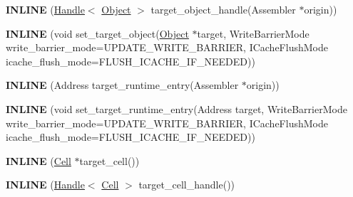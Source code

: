 \begin{DoxyCompactItemize}
\item 
\hypertarget{classv8_1_1internal_1_1_reloc_info_abd1a358990f0a48e294f2b420681ffeb}{}{\bfseries I\+N\+L\+I\+N\+E} (\hyperlink{classv8_1_1internal_1_1_handle}{Handle}$<$ \hyperlink{classv8_1_1internal_1_1_object}{Object} $>$ target\+\_\+object\+\_\+handle(Assembler $\ast$origin))\label{classv8_1_1internal_1_1_reloc_info_abd1a358990f0a48e294f2b420681ffeb}

\item 
\hypertarget{classv8_1_1internal_1_1_reloc_info_a20fe5e264759d58a3f9ed3da08bb59ca}{}{\bfseries I\+N\+L\+I\+N\+E} (void set\+\_\+target\+\_\+object(\hyperlink{classv8_1_1internal_1_1_object}{Object} $\ast$target, Write\+Barrier\+Mode write\+\_\+barrier\+\_\+mode=U\+P\+D\+A\+T\+E\+\_\+\+W\+R\+I\+T\+E\+\_\+\+B\+A\+R\+R\+I\+E\+R, I\+Cache\+Flush\+Mode icache\+\_\+flush\+\_\+mode=F\+L\+U\+S\+H\+\_\+\+I\+C\+A\+C\+H\+E\+\_\+\+I\+F\+\_\+\+N\+E\+E\+D\+E\+D))\label{classv8_1_1internal_1_1_reloc_info_a20fe5e264759d58a3f9ed3da08bb59ca}

\item 
\hypertarget{classv8_1_1internal_1_1_reloc_info_aa18787c0c4aa5185802b95fa932641dd}{}{\bfseries I\+N\+L\+I\+N\+E} (Address target\+\_\+runtime\+\_\+entry(Assembler $\ast$origin))\label{classv8_1_1internal_1_1_reloc_info_aa18787c0c4aa5185802b95fa932641dd}

\item 
\hypertarget{classv8_1_1internal_1_1_reloc_info_a543b31672b2ba87becbc86ce19d15642}{}{\bfseries I\+N\+L\+I\+N\+E} (void set\+\_\+target\+\_\+runtime\+\_\+entry(Address target, Write\+Barrier\+Mode write\+\_\+barrier\+\_\+mode=U\+P\+D\+A\+T\+E\+\_\+\+W\+R\+I\+T\+E\+\_\+\+B\+A\+R\+R\+I\+E\+R, I\+Cache\+Flush\+Mode icache\+\_\+flush\+\_\+mode=F\+L\+U\+S\+H\+\_\+\+I\+C\+A\+C\+H\+E\+\_\+\+I\+F\+\_\+\+N\+E\+E\+D\+E\+D))\label{classv8_1_1internal_1_1_reloc_info_a543b31672b2ba87becbc86ce19d15642}

\item 
\hypertarget{classv8_1_1internal_1_1_reloc_info_afd57c668730c2b872937041116bc1a47}{}{\bfseries I\+N\+L\+I\+N\+E} (\hyperlink{classv8_1_1internal_1_1_cell}{Cell} $\ast$target\+\_\+cell())\label{classv8_1_1internal_1_1_reloc_info_afd57c668730c2b872937041116bc1a47}

\item 
\hypertarget{classv8_1_1internal_1_1_reloc_info_a53a2b792883dc89d8c83cfc7daf2b54e}{}{\bfseries I\+N\+L\+I\+N\+E} (\hyperlink{classv8_1_1internal_1_1_handle}{Handle}$<$ \hyperlink{classv8_1_1internal_1_1_cell}{Cell} $>$ target\+\_\+cell\+\_\+handle())\label{classv8_1_1internal_1_1_reloc_info_a53a2b792883dc89d8c83cfc7daf2b54e}


\end{DoxyCompactItemize}
